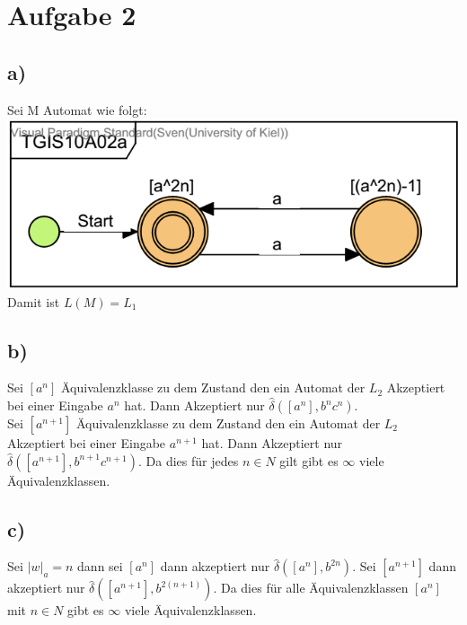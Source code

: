 \section*{Aufgabe 2}

\subsection*{a)}
Sei M Automat wie folgt:\\
\includegraphics[width=\textwidth]{part/TGIS10A02a}
Damit ist $L(M)=L_1$

\subsection*{b)}
Sei $[a^n]$ Äquivalenzklasse zu dem Zustand den ein Automat der $L_2$ Akzeptiert bei einer Eingabe $a^n$ hat. Dann Akzeptiert nur $\widehat{\delta}([a^n], b^n c^n) $. \\
Sei $[a^{n+1}]$ Äquivalenzklasse zu dem Zustand den ein Automat der $L_2$ Akzeptiert bei einer Eingabe $a^{n+1}$ hat. Dann Akzeptiert nur $\widehat{\delta}([a^{n+1}], b^{n+1} c^{n+1}) $. Da dies für jedes $n \in N$ gilt gibt es $\infty$ viele Äquivalenzklassen.

\subsection*{c)}
Sei $|w|_a=n$ dann sei $[a^n]$ dann akzeptiert nur $\widehat{\delta}([a^{n}], b^{2n} ) $. Sei $[a^{n+1}]$ dann akzeptiert nur $\widehat{\delta}([a^{n+1}], b^{2(n+1)} ) $. Da dies für alle Äquivalenzklassen $[a^n]$ mit $n \in N$ gibt es $\infty$ viele Äquivalenzklassen.

